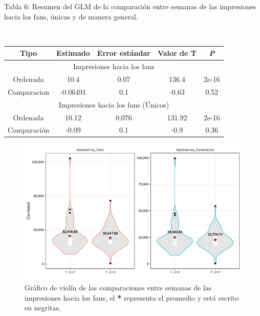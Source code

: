 \documentclass[a4paper,10pt]{article}
\begin{document}
\begin{center}
 \caption{Tabla 6: Resumen del GLM de la comparación entre semanas de las impresiones hacia los fans, únicas y de manera general.} \\ [0.3cm]
 {\footnotesize
  \begin{tabular}{c|c|c|c|c}
   \hline
   Tipo & Estimado & Error estándar & Valor de T & \textit{P} \\
   \hline
   \multicolumn{5}{c}{Impresiones hacia los fans} \\
   \hline
   Ordenada & 10.4 & 0.07 & 136.4 & 2e-16 \\ 
   Comparacion & -0.06491 & 0.1 & -0.63 & 0.52 \\
   \hline
   \multicolumn{5}{c}{Impresiones hacia los fans (Únicos)} \\
   \hline
   Ordenada & 10.12 & 0.076 & 131.92 & 2e-16 \\
   Comparación & -0.09 & 0.1 & -0.9 & 0.36 \\
   \hline
  \end{tabular}
 }
\end{center}

\begin{figure}[H]
\begin{center}
 \includegraphics[width = .75\textwidth]{imagenes/graficas/comparacion5.png}
 \caption{Gráfico de violín de las comparaciones entre semanas de las impresiones hacia los fans,
 el \textbf{*} representa el promedio y está escrito en negritas.}
\end{center}
\end{figure}
\end{document}
